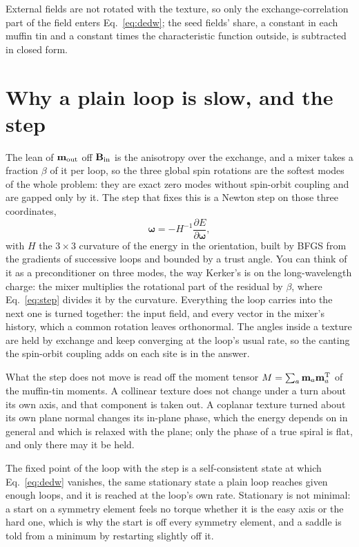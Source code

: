 \documentclass[11pt]{article}
\begin{document}
External fields are not rotated with the texture, so only the
exchange-correlation part of the field enters Eq.~\eqref{eq:dedw}; the seed
fields' share, a constant in each muffin tin and a constant times the
characteristic function outside, is subtracted in closed form.

\section{Why a plain loop is slow, and the step}

The lean of $\mathbf m_{\rm out}$ off $\mathbf B_{\rm in}$ is the anisotropy
over the exchange, and a mixer takes a fraction $\beta$ of it per loop, so the
three global spin rotations are the softest modes of the whole problem: they
are exact zero modes without spin-orbit coupling and are gapped only by it.
The step that fixes this is a Newton step on those three coordinates,
\begin{equation}
  \boldsymbol\omega=-H^{-1}\frac{\partial E}{\partial\boldsymbol\omega},
  \label{eq:step}
\end{equation}
with $H$ the $3\times3$ curvature of the energy in the orientation, built by
BFGS from the gradients of successive loops and bounded by a trust angle. You
can think of it as a preconditioner on three modes, the way Kerker's is on the
long-wavelength charge: the mixer multiplies the rotational part of the
residual by $\beta$, where Eq.~\eqref{eq:step} divides it by the curvature.
Everything the loop carries into the next one is turned together: the input
field, and every vector in the mixer's history, which a common rotation leaves
orthonormal. The angles inside a texture are held by exchange and keep
converging at the loop's usual rate, so the canting the spin-orbit coupling
adds on each site is in the answer.

What the step does not move is read off the moment tensor
$M=\sum_a\mathbf m_a\mathbf m_a^{\rm T}$ of the muffin-tin moments. A collinear
texture does not change under a turn about its own axis, and that component is
taken out. A coplanar texture turned about its own plane normal changes its
in-plane phase, which the energy depends on in general and which is relaxed
with the plane; only the phase of a true spiral is flat, and only there may it
be held.

The fixed point of the loop with the step is a self-consistent state at which
Eq.~\eqref{eq:dedw} vanishes, the same stationary state a plain loop reaches
given enough loops, and it is reached at the loop's own rate. Stationary is
not minimal: a start on a symmetry element feels no torque whether it is the
easy axis or the hard one, which is why the start is off every symmetry
element, and a saddle is told from a minimum by restarting slightly off it.
\end{document}

